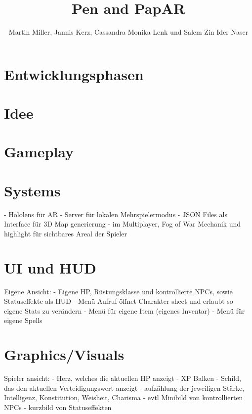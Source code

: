 \documentclass[11pt]{article}
\begin{document}
    \title{Pen and PapAR}
    \author{Martin Miller, Jannis Kerz, Cassandra Monika Lenk und Salem Zin Ider Naser}

    \maketitle
    \newpage

    \tableofcontents
    \newpage

    \section{Entwicklungsphasen}\label{sec:chapter_dev_process}
    

    \section{Idee}\label{sec:chapter_idea}
    

    \section{Gameplay}\label{sec:chapter_gameplay}
    

    \section{Systems}\label{sec:systems}
    

    - Hololens für AR
    - Server für lokalen Mehrspielermodus
    - JSON Files als Interface für 3D Map generierung
    - im Multiplayer, Fog of War Mechanik und highlight für sichtbares Areal der Spieler

    \section{UI und HUD}\label{sec:ui-und-hud}
    Eigene Ansicht:
    - Eigene HP, Rüstungsklasse und kontrollierte NPCs, sowie Statuseffekte als HUD
    - Menü Aufruf öffnet Charakter sheet und erlaubt so eigene Stats zu verändern
    - Menü für eigene Item (eigenes Inventar)
    - Menü für eigene Spells

    \section{Graphics/Visuals}\label{sec:graphics/visuals}
    Spieler ansicht:
    - Herz, welches die aktuellen HP anzeigt
    - XP Balken
    - Schild, das den aktuellen Verteidigungswert anzeigt
    - aufzählung der jeweiligen Stärke, Intelligenz, Konstitution, Weisheit, Charisma
    - evtl Minibild von kontrollierten NPCs
    - kurzbild von Statuseffekten
\end{document}
